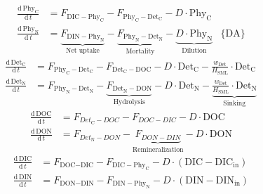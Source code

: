 \documentclass[gmd, manuscript]{copernicus}
\begin{document}
\begin{subequations}\label{eq:phy}
 \begin{flalign}
  \label{eq:sPhyC}
  \frac{\mathrm{d}\, \text{Phy}_{\text{C}}}{\mathrm{d}\, t} &= F_{\text{DIC}-\text{Phy}_{\text{C}}} - F_{\text{Phy}_{\text{C}}-\text{Det}_{\text{C}}} - D \cdot \text{Phy}_{\text{C}}\\
  \label{eq:sPhyN}
  \frac{\mathrm{d}\, \text{Phy}_{\text{N}}}{\mathrm{d}\, t} &= \underbrace{F_{\text{DIN}-\text{Phy}_{\text{N}}}}_{\text{Net uptake}} - \underbrace{F_{\text{Phy}_{\text{N}}-\text{Det}_{\text{N}}}}_{\text{Mortality}} - \underbrace{D \cdot \text{Phy}_{\text{N}}}_{\text{Dilution}} &  \{\text{DA}\}
 \end{flalign}
\end{subequations}
\begin{subequations}\label{eq:det}
  \begin{flalign}
  \label{eq:sDetC}
  \frac{\mathrm{d}\, \text{Det}_{\text{C}}}{\mathrm{d}\, t} &= F_{\text{Phy}_{\text{C}}-\text{Det}_{\text{C}}} - F_{\text{Det}_{\text{C}}-\text{DOC}}  - D \cdot \text{Det}_{\text{C}} - \frac{w_{\text{Det}}}{H_{\text{SML}}} \cdot \text{Det}_{\text{C}} \\
  \label{eq:sDetN}
  \frac{\mathrm{d}\, \text{Det}_{\text{N}}}{\mathrm{d}\, t} &= F_{\text{Phy}_{\text{N}}-\text{Det}_{\text{N}}} - \underbrace{F_{\text{Det}_{\text{N}}-\text{DON}}}_\textrm{Hydrolysis} - D \cdot \text{Det}_{\text{N}} - \underbrace{\frac{w_{\text{Det}}}{H_{\text{SML}}} \cdot \text{Det}_{\text{N}}}_{\text{Sinking}}
\end{flalign}  
\end{subequations}
\begin{subequations}\label{eq:dom}
  \begin{align}
   \label{eq:doc}
   \frac{\mathrm{d}\, \text{DOC}}{\mathrm{d}\, t} &= F_{Det_{\text{C}}-DOC} - F_{DOC-DIC} - D \cdot \text{DOC}\\
   \label{eq:don}
   \frac{\mathrm{d}\, \text{DON}}{\mathrm{d}\, t} &= F_{Det_{\text{N}}-DON} - \underbrace{F_{DON-DIN}}_\textrm{Remineralization} - D \cdot \text{DON}
  \end{align}
\end{subequations}
\begin{subequations}\label{eq:dim}
\begin{flalign}
  \label{eq:dic}
  \frac{\mathrm{d}\, \text{DIC}}{\mathrm{d}\, t} &= F_{\text{DOC}-\text{DIC}} - F_{\text{DIC}-\text{Phy}_{\text{C}}} - D \cdot(\text{DIC}-\text{DIC}_{\text{in}}) \\
  \label{eq:sdin}
  \frac{\mathrm{d}\,\text{DIN}}{\mathrm{d}\,t} &= F_{\text{DON}-\text{DIN}} - F_{\text{DIN}-\text{Phy}_{\text{N}}} - D \cdot (\text{DIN}-\text{DIN}_{\text{in}})
\end{flalign}  
\end{subequations}
\end{document}
